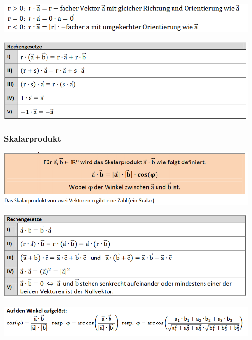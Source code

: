 \includegraphics[scale=0.7]{vec3-1.PNG}

\includegraphics[scale=0.7]{vec3-2.PNG}

\subsubsection{Skalarprodukt}
\includegraphics[scale=0.7]{vec4.PNG}

\includegraphics[scale=0.7]{vec4-1.PNG}

\includegraphics[scale=0.7]{vec4-2.PNG}

